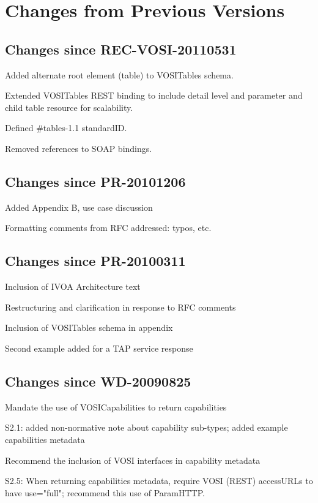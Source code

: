 \documentclass[11pt,letter]{ivoa}
\begin{document}
\section{Changes from Previous Versions}
\label{appendix:changes}

\subsection{Changes since REC-VOSI-20110531}

Added alternate root element (table) to VOSITables schema.

Extended VOSITables REST binding to include detail level and parameter and child table resource for scalability.

Defined \#tables-1.1 standardID.

Removed references to SOAP bindings.

\subsection{Changes since PR-20101206}

Added Appendix B, use case discussion
    
Formatting comments from RFC addressed: typos, etc.

\subsection{Changes since PR-20100311}

Inclusion of IVOA Architecture text

Restructuring and clarification in response to RFC comments

Inclusion of VOSITables schema in appendix

Second example added for a TAP service response

\subsection{Changes since WD-20090825}

Mandate the use of VOSICapabilities to return capabilities

S2.1: added non-normative note about capability sub-types; added example capabilities metadata

Recommend the inclusion of VOSI interfaces in capability metadata

S2.5: When returning capabilities metadata, require VOSI (REST) accessURLs to have use="full"; recommend this use of ParamHTTP.
\end{document}
